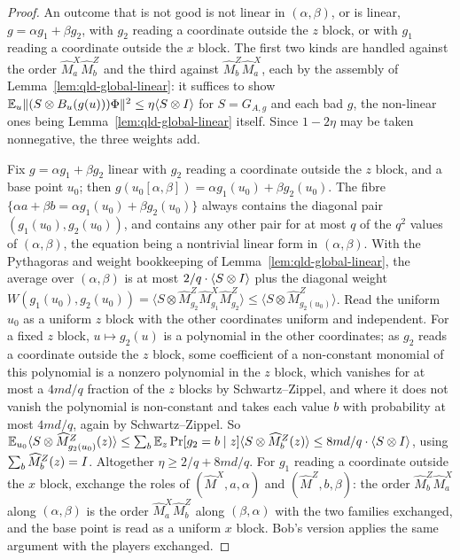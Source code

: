 \begin{proof}
\leanok
An outcome that is not good is not linear in $(\alpha, \beta)$, or is linear,
$g = \alpha g_1 + \beta g_2$, with $g_2$ reading a coordinate outside the $z$ block, or with
$g_1$ reading a coordinate outside the $x$ block. The first two kinds are handled against the
order $\widehat M^X_a \widehat M^Z_b$ and the third against $\widehat M^Z_b \widehat M^X_a$, each
by the assembly of Lemma~\ref{lem:qld-global-linear}: it suffices to show
$\mathbb E_u \|(S \otimes B_u(g(u)))\Phi\|^2 \leq \eta \langle S \otimes I \rangle$ for
$S = G_{A,g}$ and each bad $g$, the non-linear ones being Lemma~\ref{lem:qld-global-linear}
itself. Since $1 - 2\eta$ may be taken nonnegative, the three weights add.

Fix $g = \alpha g_1 + \beta g_2$ linear with $g_2$ reading a coordinate outside the $z$ block,
and a base point $u_0$; then $g(u_0[\alpha, \beta]) = \alpha g_1(u_0) + \beta g_2(u_0)$. The
fibre $\{\alpha a + \beta b = \alpha g_1(u_0) + \beta g_2(u_0)\}$ always contains the diagonal
pair $(g_1(u_0), g_2(u_0))$, and contains any other pair for at most $q$ of the $q^2$ values of
$(\alpha, \beta)$, the equation being a nontrivial linear form in $(\alpha, \beta)$. With the
Pythagoras and weight bookkeeping of Lemma~\ref{lem:qld-global-linear}, the average over
$(\alpha, \beta)$ is at most $2/q \cdot \langle S \otimes I \rangle$ plus the diagonal weight
$W(g_1(u_0), g_2(u_0)) = \langle S \otimes \widehat M^Z_{g_2} \widehat M^X_{g_1}
\widehat M^Z_{g_2} \rangle \leq \langle S \otimes \widehat M^Z_{g_2(u_0)} \rangle$. Read the
uniform $u_0$ as a uniform $z$ block with the other coordinates uniform and independent. For a
fixed $z$ block, $u \mapsto g_2(u)$ is a polynomial in the other coordinates; as $g_2$ reads a
coordinate outside the $z$ block, some coefficient of a non-constant monomial of this polynomial
is a nonzero polynomial in the $z$ block, which vanishes for at most a $4md/q$ fraction of the
$z$ blocks by Schwartz--Zippel, and where it does not vanish the polynomial is non-constant and
takes each value $b$ with probability at most $4md/q$, again by Schwartz--Zippel. So
$\mathbb E_{u_0} \langle S \otimes \widehat M^Z_{g_2(u_0)}(z) \rangle
  \leq \sum_b \mathbb E_z \Pr[g_2 = b \mid z] \langle S \otimes \widehat M^Z_b(z) \rangle
  \leq 8md/q \cdot \langle S \otimes I \rangle$,
using $\sum_b \widehat M^Z_b(z) = I$. Altogether $\eta \geq 2/q + 8md/q$. For $g_1$ reading a
coordinate outside the $x$ block, exchange the roles of $(\widehat M^X, a, \alpha)$ and
$(\widehat M^Z, b, \beta)$: the order $\widehat M^Z_b \widehat M^X_a$ along $(\alpha, \beta)$ is
the order $\widehat M^X_a \widehat M^Z_b$ along $(\beta, \alpha)$ with the two families exchanged,
and the base point is read as a uniform $x$ block. Bob's version applies the same argument with
the players exchanged.
\end{proof}

